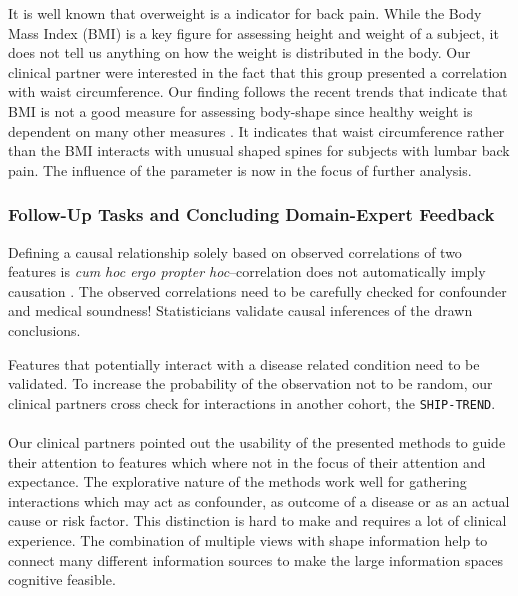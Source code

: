\documentclass[journal]{style/vgtc} 			          %
\begin{document}
It is well known that overweight is a indicator for back pain.
%
While the Body Mass Index (BMI) is a key figure for assessing height and weight of a subject, it does not tell us anything on how the weight is distributed in the body.
%
Our clinical partner were interested in the fact that this group presented a correlation with waist circumference.
%
Our finding follows the recent trends that indicate that BMI is not a good measure for assessing body-shape since healthy weight is dependent on many other measures \cite{Ahima2013}.
%
It indicates that waist circumference rather than the BMI interacts with unusual shaped spines for subjects with lumbar back pain.
%
The influence of the parameter is now in the focus of further analysis.

\subsubsection{Follow-Up Tasks and Concluding Domain-Expert Feedback}
Defining a causal relationship solely based on observed correlations of two features is \emph{cum hoc ergo propter hoc}--correlation does not automatically imply causation \cite{Tufte2003}.
%
The observed correlations need to be carefully checked for confounder and medical soundness!
%
Statisticians validate causal inferences of the drawn conclusions.

Features that potentially interact with a disease related condition need to be validated.
%
To increase the probability of the observation not to be random, our clinical partners cross check for interactions in another cohort, the \texttt{SHIP-TREND}.
%
\\\\
Our clinical partners pointed out the usability of the presented methods to guide their attention to features which where not in the focus of their attention and expectance.
%
The explorative nature of the methods work well for gathering interactions which may act as confounder, as outcome of a disease or as an actual cause or risk factor.
%
This distinction is hard to make and requires a lot of clinical experience.
%
The combination of multiple views with shape information help to connect many different information sources to make the large information spaces cognitive feasible.
%
\end{document}
